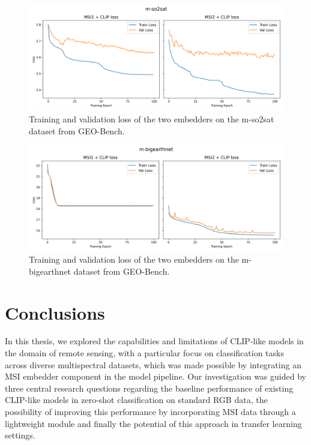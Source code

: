 \documentclass[a4paper, twoside, english]{sapthesis} %
\begin{document}
\vspace{-0.5cm}

\begin{figure}[h]
    \centering
    \includegraphics[width=\textwidth]{img/m-so2sat_loss_plot.png}
    \caption{\normalsize Training and validation loss of the two embedders on the m-so2sat dataset from GEO-Bench.}
    \label{fig:so2satloss}
\end{figure}

\vspace{-0.5cm}

\begin{figure}[h]
    \centering
    \includegraphics[width=\textwidth]{img/m-bigearthnet_loss_plot.png}
    \caption{\normalsize Training and validation loss of the two embedders on the m-bigearthnet dataset from GEO-Bench.}
    \label{fig:benloss}
\end{figure}



\chapter{Conclusions} %

In this thesis, we explored the capabilities and limitations of CLIP-like models in the domain of remote sensing, with a particular focus on classification tasks across diverse multispectral datasets, which was made possible by integrating an MSI embedder component in the model pipeline. Our investigation was guided by three central research questions regarding the baseline performance of existing CLIP-like models in zero-shot classification on standard RGB data, the possibility of improving this performance by incorporating MSI data through a lightweight module and finally the potential of this approach in transfer learning settings. \\
\end{document}
